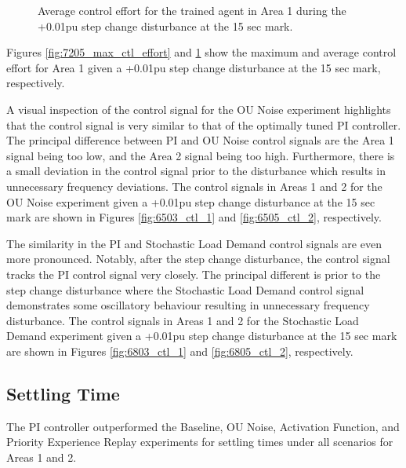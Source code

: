 \begin{figure}[h]
	\begin{minipage}[t]{0.50\textwidth}
		\centering
		\resizebox{7cm}{!}{}
		\caption{Maximum control effort for the trained agent in Area 1 during the +0.01pu step change disturbance at the 15 sec mark.}\label{fig:7205_max_ctl_effort}
	\end{minipage}
	\hspace{0.25cm}
	\begin{minipage}[t]{0.50\textwidth}
		\resizebox{7cm}{!}{}
		\caption{Average control effort for the trained agent in Area 1 during the +0.01pu step change disturbance at the 15 sec mark.}\label{fig:7205_avg_ctl_effort}
	\end{minipage}
\end{figure}

Figures \ref{fig:7205_max_ctl_effort} and \ref{fig:7205_avg_ctl_effort} show the maximum and average control effort for Area 1 given a +0.01pu step change disturbance at the 15 sec mark, respectively.

A visual inspection of the control signal for the OU Noise experiment highlights that the control signal is very similar to that of the optimally tuned PI controller. The principal difference between PI and OU Noise control signals are the Area 1 signal being too low, and the Area 2 signal being too high. Furthermore, there is a small deviation in the control signal prior to the disturbance which results in unnecessary frequency deviations. The control signals in Areas 1 and 2 for the OU Noise experiment given a +0.01pu step change disturbance at the 15 sec mark are shown in Figures \ref{fig:6503_ctl_1} and \ref{fig:6505_ctl_2}, respectively.

The similarity in the PI and Stochastic Load Demand control signals are even more pronounced. Notably, after the step change disturbance, the control signal tracks the PI control signal very closely. The principal different is prior to the step change disturbance where the Stochastic Load Demand control signal demonstrates some oscillatory behaviour resulting in unnecessary frequency disturbance. The control signals in Areas 1 and 2 for the Stochastic Load Demand experiment given a +0.01pu step change disturbance at the 15 sec mark are shown in Figures \ref{fig:6803_ctl_1} and \ref{fig:6805_ctl_2}, respectively.


\subsection{Settling Time}
The PI controller outperformed the Baseline, OU Noise, Activation Function, and Priority Experience Replay experiments for settling times under all scenarios for Areas 1 and 2.


